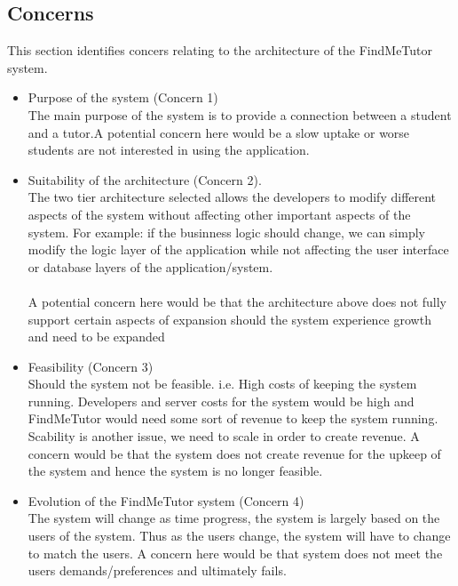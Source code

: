 \documentclass[12pt]{article}
\begin{document}
\subsection{Concerns}
This section identifies concers relating to the architecture of the FindMeTutor system.
\begin{itemize}

\item Purpose of the system (Concern 1)\\
The main purpose of the system is to provide a connection between a student and a tutor.A potential concern here would be a slow uptake or worse students are not interested in using the application.

\item Suitability of the architecture (Concern 2).\\
The two tier architecture selected allows the developers to modify different aspects of the system without affecting other important aspects of the system. For example: if the businness logic should change, we can simply modify the logic layer of the application while not affecting the user interface or database layers of the application/system.\\\\A potential concern here would be that the architecture above does not fully support certain aspects of expansion should the system experience growth and need to be expanded

\item Feasibility (Concern 3)\\
Should the system not be feasible. i.e. High costs of keeping the system running. Developers and server costs for the system would be high and FindMeTutor would need some sort of revenue to keep the system running. Scability is another issue, we need to scale in order to create revenue. A concern would be that the system does not create revenue for the upkeep of the system and hence the system is no longer feasible.

\item Evolution of the FindMeTutor system (Concern 4)\\
The system will change as time progress, the system is largely based on the users of the system. Thus as the users change, the system will have to change to match the users. A concern here would be that system does not meet the users demands/preferences and ultimately fails.
\end{itemize}
\end{document}
